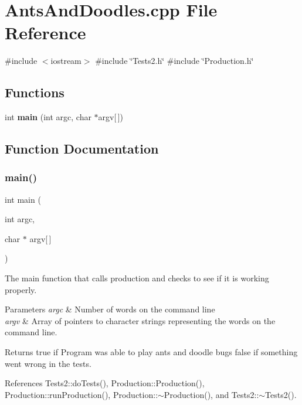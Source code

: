 \section{Ants\+And\+Doodles.\+cpp File Reference}
\label{AntsAndDoodles_8cpp}
{\ttfamily \#include $<$iostream$>$}\newline
{\ttfamily \#include \char`\"{}Tests2.\+h\char`\"{}}\newline
{\ttfamily \#include \char`\"{}Production.\+h\char`\"{}}\newline
\subsection*{Functions}
\begin{DoxyCompactItemize}
\item 
int \textbf{ main} (int argc, char $\ast$argv[$\,$])
\end{DoxyCompactItemize}


\subsection{Function Documentation}
\mbox{\label{AntsAndDoodles_8cpp_a0ddf1224851353fc92bfbff6f499fa97}} 
\subsubsection{main()}
{\footnotesize\ttfamily int main (\begin{DoxyParamCaption}\item[{int}]{argc,  }\item[{char $\ast$}]{argv[$\,$] }\end{DoxyParamCaption})}

The main function that calls production and checks to see if it is working properly.


\begin{DoxyParams}{Parameters}
{\em argc} & Number of words on the command line \\
\hline
{\em argv} & Array of pointers to character strings representing the words on the command line. \\
\hline
\end{DoxyParams}
\begin{DoxyReturn}{Returns}
true if Program was able to play ants and doodle bugs false if something went wrong in the tests. 
\end{DoxyReturn}


References Tests2\+::do\+Tests(), Production\+::\+Production(), Production\+::run\+Production(), Production\+::$\sim$\+Production(), and Tests2\+::$\sim$\+Tests2().

